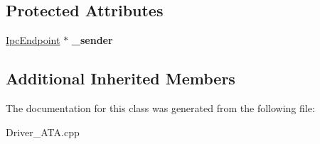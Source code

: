 \subsection*{Protected Attributes}
\begin{DoxyCompactItemize}
\item 
\mbox{\label{class_a_t_a_driver_drive_1_1_request_handler_a2af59c0622082a091ed6f83a89e74f89}} 
\hyperlink{class_ipc_endpoint}{Ipc\+Endpoint} $\ast$ {\bfseries \+\_\+sender}
\end{DoxyCompactItemize}
\subsection*{Additional Inherited Members}


The documentation for this class was generated from the following file\+:\begin{DoxyCompactItemize}
\item 
Driver\+\_\+\+A\+T\+A.\+cpp\end{DoxyCompactItemize}
